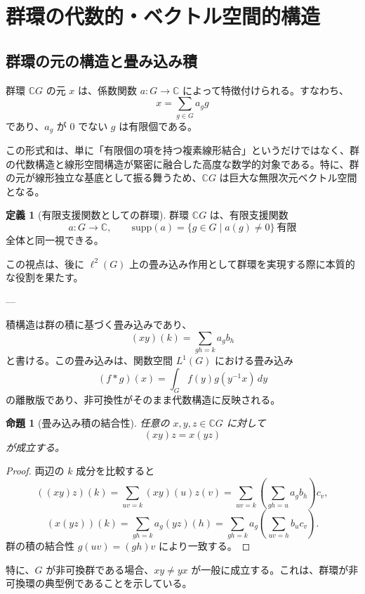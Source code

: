 \documentclass[12pt,a4paper]{ltjarticle}
\newtheorem*{proposition}{命題}
\theoremstyle{definition}
\newtheorem*{definition}{定義}
\begin{document}
\section{群環の代数的・ベクトル空間的構造}

\subsection{群環の元の構造と畳み込み積}

群環 $\mathbb{C}G$ の元 $x$ は、係数関数 $a: G \to \mathbb{C}$ によって特徴付けられる。すなわち、
\[
x = \sum_{g \in G} a_g g
\]
であり、$a_g$ が 0 でない $g$ は有限個である。

この形式和は、単に「有限個の項を持つ複素線形結合」というだけではなく、群の代数構造と線形空間構造が緊密に融合した高度な数学的対象である。特に、群の元が線形独立な基底として振る舞うため、$\mathbb{C}G$ は巨大な無限次元ベクトル空間となる。

\begin{definition}[有限支援関数としての群環]
群環 $\mathbb{C}G$ は、有限支援関数
\[
a:G\to\mathbb{C},\qquad \mathrm{supp}(a)=\{g\in G\mid a(g)\neq 0\}\ \text{有限}
\]
全体と同一視できる。
\end{definition}

この視点は、後に $\ell^2(G)$ 上の畳み込み作用として群環を実現する際に本質的な役割を果たす。

---

積構造は群の積に基づく畳み込みであり、
\[
(xy)(k) = \sum_{gh=k} a_g b_h
\]
と書ける。この畳み込みは、関数空間 $L^1(G)$ における畳み込み
\[
(f * g)(x) = \int_G f(y) g(y^{-1}x) \, dy
\]
の離散版であり、非可換性がそのまま代数構造に反映される。

\begin{proposition}[畳み込み積の結合性]
任意の $x,y,z\in\mathbb{C}G$ に対して
\[
(xy)z = x(yz)
\]
が成立する。
\end{proposition}

\begin{proof}
両辺の $k$ 成分を比較すると
\[
((xy)z)(k)=\sum_{uv=k}(xy)(u)z(v)=\sum_{uv=k}\left(\sum_{gh=u}a_g b_h\right)c_v,
\]
\[
(x(yz))(k)=\sum_{gh=k}a_g(yz)(h)=\sum_{gh=k}a_g\left(\sum_{uv=h}b_u c_v\right).
\]
群の積の結合性 $g(uv)=(gh)v$ により一致する。
\end{proof}

特に、$G$ が非可換群である場合、$xy \neq yx$ が一般に成立する。これは、群環が非可換環の典型例であることを示している。
\end{document}

